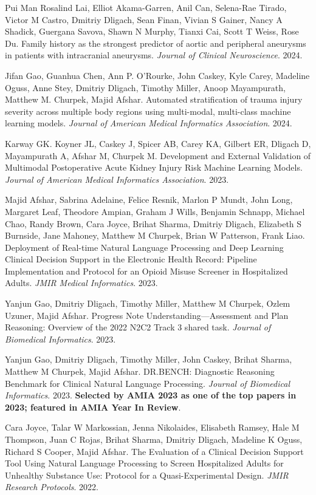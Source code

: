\documentclass[letterpaper]{article}
\renewenvironment{itemize}{
  \begin{list}{}{
    \setlength{\leftmargin}{1.5em}
  }
}{
  \end{list}
}
\begin{document}
\begin{itemize}
\item Pui Man Rosalind Lai, Elliot Akama-Garren, Anil Can, Selena-Rae Tirado, Victor M Castro, Dmitriy Dligach, Sean Finan, Vivian S Gainer, Nancy A Shadick, Guergana Savova, Shawn N Murphy, Tianxi Cai, Scott T Weiss, Rose Du. Family history as the strongest predictor of aortic and peripheral aneurysms in patients with intracranial aneurysms. \emph{Journal of Clinical Neuroscience}. 2024.
\item Jifan Gao, Guanhua Chen, Ann P. O’Rourke, John Caskey, Kyle Carey, Madeline Oguss, Anne Stey, Dmitriy Dligach, Timothy Miller, Anoop Mayampurath, Matthew M. Churpek, Majid Afshar. Automated stratification of trauma injury severity across multiple body regions using multi-modal, multi-class machine learning models. \emph{Journal of American Medical Informatics Association}. 2024.
\item Karway GK. Koyner JL, Caskey J, Spicer AB, Carey KA, Gilbert ER, Dligach D, Mayampurath A, Afshar M, Churpek M. Development and External Validation of Multimodal Postoperative Acute Kidney Injury Risk Machine Learning Models. \emph{Journal of American Medical Informatics Association}. 2023.
\item Majid Afshar, Sabrina Adelaine, Felice Resnik, Marlon P Mundt, John Long, Margaret Leaf, Theodore Ampian, Graham J Wills, Benjamin Schnapp, Michael Chao, Randy Brown, Cara Joyce, Brihat Sharma, Dmitriy Dligach, Elizabeth S Burnside, Jane Mahoney, Matthew M Churpek, Brian W Patterson, Frank Liao. Deployment of Real-time Natural Language Processing and Deep Learning Clinical Decision Support in the Electronic Health Record: Pipeline Implementation and Protocol for an Opioid Misuse Screener in Hospitalized Adults. \emph{JMIR Medical Informatics}. 2023.
\item Yanjun Gao, Dmitriy Dligach, Timothy Miller, Matthew M Churpek, Ozlem Uzuner, Majid Afshar. Progress Note Understanding—Assessment and Plan Reasoning: Overview of the 2022 N2C2 Track 3 shared task. \emph{Journal of Biomedical Informatics}. 2023.
\item Yanjun Gao, Dmitriy Dligach, Timothy Miller, John Caskey, Brihat Sharma, Matthew M Churpek, Majid Afshar. DR.BENCH: Diagnostic Reasoning Benchmark for Clinical Natural Language Processing. \emph{Journal of Biomedical Informatics}. 2023. \textbf{Selected by AMIA 2023 as one of the top papers in 2023; featured in AMIA Year In Review}.
\item Cara Joyce, Talar W Markossian, Jenna Nikolaides, Elisabeth Ramsey, Hale M Thompson, Juan C Rojas, Brihat Sharma, Dmitriy Dligach, Madeline K Oguss, Richard S Cooper, Majid Afshar. The Evaluation of a Clinical Decision Support Tool Using Natural Language Processing to Screen Hospitalized Adults for Unhealthy Substance Use: Protocol for a Quasi-Experimental Design. \emph{JMIR Research Protocols}. 2022.

\end{itemize}
\end{document}
